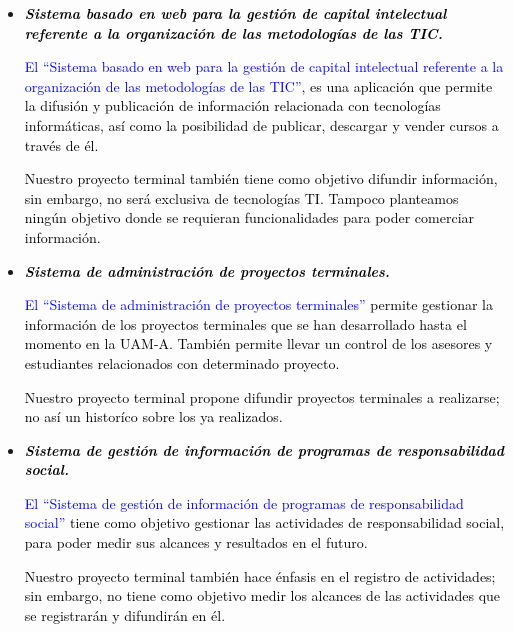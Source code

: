 \documentclass[11pt,letterpaper,titlepage]{article}
\begin{document}
\begin{itemize}

  \item \textcolor{black}{\textit{\textbf{Sistema basado en web para la gesti\'on de capital intelectual referente a la organizaci\'on de las metodolog\'ias de las TIC.}}}

\textcolor{black}{\textcolor{blue}{El ``Sistema basado en web para la gesti\'on de capital intelectual referente a la organizaci\'on de las metodolog\'ias de las TIC''\cite{*}}, es una aplicaci\'on que permite la difusi\'on y publicaci\'on de informaci\'on relacionada con tecnolog\'ias inform\'aticas, as\'i como la posibilidad de publicar, descargar y vender cursos a trav\'es de \'el.}

\textcolor{black}{Nuestro proyecto terminal tambi\'en tiene como objetivo difundir informaci\'on, sin embargo, no ser\'a exclusiva de tecnolog\'ias TI. Tampoco planteamos ning\'un objetivo donde se requieran funcionalidades para poder comerciar informaci\'on.}

  \item \textcolor{black}{\textit{\textbf{Sistema de administraci\'on de proyectos terminales.}}}

\textcolor{black}{\textcolor{blue}{El ``Sistema de administraci\'on de proyectos terminales''\cite{*}} permite gestionar la informaci\'on de los proyectos terminales que se han desarrollado hasta el momento en la UAM-A. Tambi\'en permite llevar un control de los asesores y estudiantes relacionados con determinado proyecto.}

\textcolor{black}{Nuestro proyecto terminal propone difundir proyectos terminales a realizarse; no as\'i un histor\'ico sobre los ya realizados.}

  \item \textcolor{black}{\textit{\textbf{Sistema de gesti\'on de informaci\'on de programas de responsabilidad social.}}}

\textcolor{black}{\textcolor{blue}{El ``Sistema de gesti\'on de informaci\'on de programas de responsabilidad social''\cite{*}} tiene como objetivo gestionar las actividades de responsabilidad social, para poder medir sus alcances y resultados en el futuro.}

\textcolor{black}{Nuestro proyecto terminal tambi\'en hace \'enfasis en el registro de actividades; sin embargo, no tiene como objetivo medir los alcances de las actividades que se registrar\'an y difundir\'an en \'el.}

\end{itemize}
\end{document}

